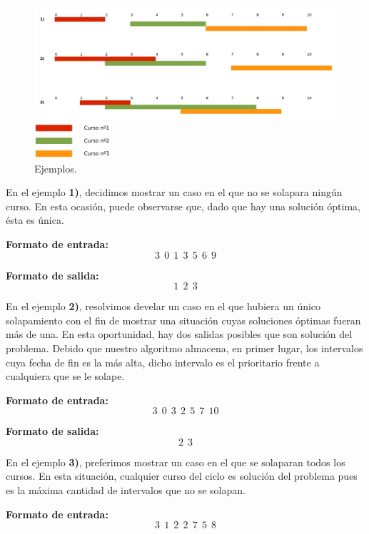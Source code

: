 \begin{figure}[H] %
\begin{center}
\includegraphics[width=450pt]{../imgs/ejemplosej2.jpg}
\end{center}
\includegraphics[width=80pt]{../imgs/leyendaejemploej2.jpg}
\caption{Ejemplos.}
\end{figure}
En el ejemplo \textbf{1)}, decidimos mostrar un caso en el que no se solapara ningún curso. En esta ocasión, puede observarse que, dado que hay una solución óptima, ésta es única.\newline

\textbf{Formato de entrada:} $$3\ \ 0\ \ 1\ \ 3\ \ 5\ \ 6\ \ 9$$

\textbf{Formato de salida:} $$1\ \ 2\ \ 3$$

En el ejemplo \textbf{2)}, resolvimos develar un caso en el que hubiera un único solapamiento con el fin de mostrar una situación cuyas soluciones óptimas fueran más de una. En esta oportunidad, hay dos salidas posibles que son solución del problema. Debido que nuestro algoritmo almacena, en primer lugar, los intervalos cuya fecha de fin es la más alta, dicho intervalo es el prioritario frente a cualquiera que se le solape.\newline

\textbf{Formato de entrada:} $$3\ \ 0\ \ 3\ \ 2\ \ 5\ \ 7\ \ 10$$

\textbf{Formato de salida:} $$2\ \ 3$$

En el ejemplo \textbf{3)}, preferimos mostrar un caso en el que se solaparan todos los cursos. En esta situación, cualquier curso del ciclo es solución del problema pues es la máxima cantidad de intervalos que no se solapan.\newline

\textbf{Formato de entrada:} $$3\ \ 1\ \ 2\ \ 2\ \ 7\ \ 5\ \ 8$$

